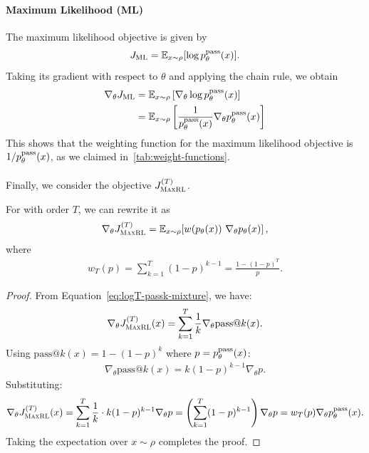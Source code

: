 \documentclass[10pt]{article} %
\begin{document}
\paragraph{Maximum Likelihood (ML)} The maximum likelihood objective is given by
\begin{equation*}
    J_\mathrm{ML} = \mathbb{E}_{x\sim \rho} [\log p^{\mathrm{pass}}_{\theta}(x)].
\end{equation*}
Taking its gradient with respect to $\theta$ and applying the chain rule, we obtain
\begin{align*}
    \nabla_\theta J_\mathrm{ML} = {} & \mathbb{E}_{x\sim \rho} \left[ \nabla_\theta \log p^{\mathrm{pass}}_{\theta}(x) \right] \\
    = {} & \mathbb{E}_{x\sim \rho} \left[ \frac{1}{p^{\mathrm{pass}}_{\theta}(x)}\nabla_\theta p^{\mathrm{pass}}_{\theta}(x) \right]
\end{align*}
This shows that the weighting function for the maximum likelihood objective is $1/p^{\mathrm{pass}}_{\theta}(x)$, as we claimed in~\cref{tab:weight-functions}.

\paragraph{\ours{}} Finally, we consider the objective $J_\mathrm{\textsc{MaxRL}}^{(T)}$. 

\begin{proposition}
    For \ours{} with order $T$, we can rewrite it as 
    \begin{align*}
    \nabla_\theta J^{(T)}_{\textsc{MaxRL}}
=
\mathbb{E}_{x \sim \rho}
\!\left[
w\!\left(p_\theta(x)\right)
\,\nabla_\theta p_\theta(x)
\right],
    \end{align*}
where 
\begin{align*}
    w_T(p)
=
\sum_{k=1}^{T} (1-p)^{k-1} = \frac{1-(1-p)^T}{p}.
\end{align*}

\begin{proof}
From Equation~\eqref{eq:logT-passk-mixture}, we have:
\begin{align*}
\nabla_\theta J^{(T)}_{\textsc{MaxRL}}(x) = \sum_{k=1}^{T} \frac{1}{k} \nabla_\theta \mathrm{pass@}k(x).
\end{align*}
Using $\mathrm{pass@}k(x) = 1 - (1-p)^k$ where $p = p^{\mathrm{pass}}_{\theta}(x)$:
\begin{align*}
\nabla_\theta \mathrm{pass@}k(x) = k(1-p)^{k-1} \nabla_\theta p.
\end{align*}
Substituting:
\begin{align*}
\nabla_\theta J^{(T)}_{\textsc{MaxRL}}(x) = \sum_{k=1}^{T} \frac{1}{k} \cdot k(1-p)^{k-1} \nabla_\theta p = \left(\sum_{k=1}^{T} (1-p)^{k-1}\right) \nabla_\theta p = w_T(p) \nabla_\theta p^{\mathrm{pass}}_{\theta}(x).
\end{align*}
Taking the expectation over $x \sim \rho$ completes the proof.
\end{proof}

\end{proposition}
    
\end{document}

